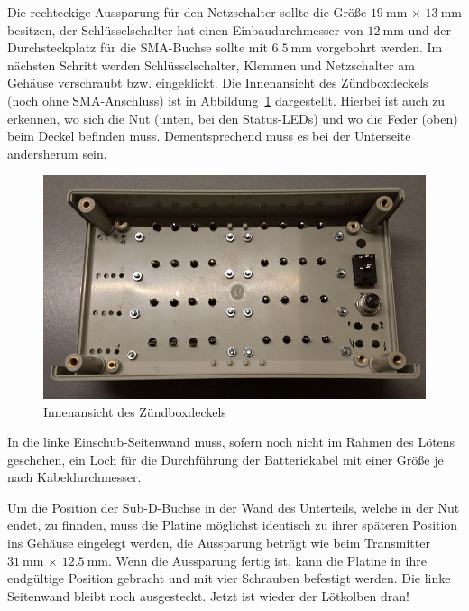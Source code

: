 \documentclass[paper=a4, parskip, numbers=noenddot, toc=listof, headsepline]{scrbook}
\begin{document}
					Die rechteckige Aussparung für den Netzschalter sollte die Größe $\SI{19}{\milli\metre}\,\times\,\SI{13}{\milli\metre}$ besitzen, der Schlüsselschalter hat einen Einbaudurchmesser von $\SI{12}{\milli\metre}$ und der Durchsteckplatz für die SMA-Buchse sollte mit $\SI{6,5}{\milli\metre}$ vorgebohrt werden. Im nächsten Schritt werden Schlüsselschalter, Klemmen und Netzschalter am Gehäuse verschraubt bzw. eingeklickt. Die Innenansicht des Zündboxdeckels (noch ohne SMA-Anschluss) ist in Abbildung~\ref{fig:zuendboxdeckel} dargestellt. Hierbei ist auch zu erkennen, wo sich die Nut (unten, bei den Status-LEDs) und wo die Feder (oben) beim Deckel befinden muss. Dementsprechend muss es bei der Unterseite andersherum sein.

					\begin{figure}
						\centering
						\includegraphics[width=\textwidth]{bilder/zuendboxdeckel}
						\caption{Innenansicht des Zündboxdeckels}
						\label{fig:zuendboxdeckel}
					\end{figure}

					In die linke Einschub-Seitenwand muss, sofern noch nicht im Rahmen des Lötens geschehen, ein Loch für die Durchführung der Batteriekabel mit einer Größe je nach Kabeldurchmesser.

					Um die Position der Sub-D-Buchse in der Wand des Unterteils, welche in der Nut endet, zu finnden, muss die Platine möglichst identisch zu ihrer späteren Position ins Gehäuse eingelegt werden, die Aussparung beträgt wie beim Transmitter $\SI{31}{\milli\metre}\,\times\,\SI{12,5}{\milli\metre}$. Wenn die Aussparung fertig ist, kann die Platine in ihre endgültige Position gebracht und mit vier Schrauben befestigt werden. Die linke Seitenwand bleibt noch ausgesteckt. Jetzt ist wieder der Lötkolben dran!
\end{document}
